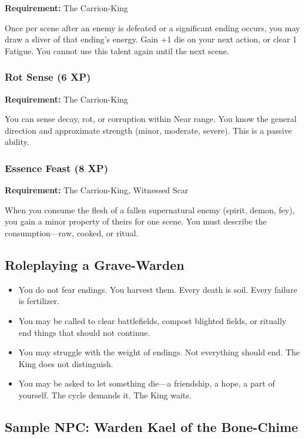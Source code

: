 \textbf{Requirement:} The Carrion-King

Once per scene after an enemy is defeated or a significant ending occurs, you may draw a sliver of that ending's energy. Gain +1 die on your next action, or clear 1 Fatigue. You cannot use this talent again until the next scene.

\subsubsection{Rot Sense (6 XP)}

\textbf{Requirement:} The Carrion-King

You can sense decay, rot, or corruption within Near range. You know the general direction and approximate strength (minor, moderate, severe). This is a passive ability.

\subsubsection{Essence Feast (8 XP)}

\textbf{Requirement:} The Carrion-King, Witnessed Scar

When you consume the flesh of a fallen supernatural enemy (spirit, demon, fey), you gain a minor property of theirs for one scene. You must describe the consumption—raw, cooked, or ritual.

\subsection{Roleplaying a Grave-Warden}

\begin{itemize}
\item You do not fear endings. You harvest them. Every death is soil. Every failure is fertilizer.
\item You may be called to clear battlefields, compost blighted fields, or ritually end things that should not continue.
\item You may struggle with the weight of endings. Not everything should end. The King does not distinguish.
\item You may be asked to let something die—a friendship, a hope, a part of yourself. The cycle demands it. The King waits.
\end{itemize}

\subsection{Sample NPC: Warden Kael of the Bone-Chime}

